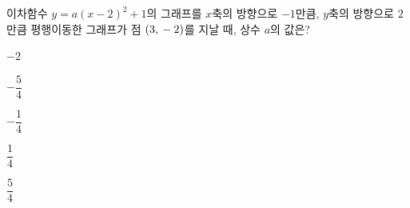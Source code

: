 이차함수 $y=a(x-2)^2+1$의 그래프를 $x$축의 방향으로 $-1$만큼, $y$축의 방향으로 $2$만큼 평행이동한 그래프가 점 $(3{,}\mkern3mu -2)$를 지날 때, 상수 $a$의 값은?
\begin{choices32}{\rule[-3ex]{0pt}{8ex}$-2$}{\rule[-3ex]{0pt}{8ex}$-\dfrac{5}{4}$}{\rule[-3ex]{0pt}{8ex}$-\dfrac{1}{4}$}{\rule[-3ex]{0pt}{8ex}$\dfrac{1}{4}$}{\rule[-3ex]{0pt}{8ex}$\dfrac{5}{4}$}\end{choices32}

